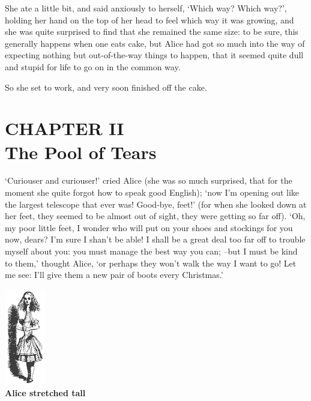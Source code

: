 \documentclass{article}
\begin{document}
She ate a little bit, and said anxiously to herself, `Which way? Which way?', holding her hand on the top of her head to feel which way it was growing, and she was quite surprised to find that she remained the same size: to be sure, this generally happens when one eats cake, but Alice had got so much into the way of expecting nothing but out-of-the-way things to happen, that it seemed quite dull and stupid for life to go on in the common way.

So she set to work, and very soon finished off the cake.

\newpage

\section*{CHAPTER II \\ The Pool of Tears}

`Curiouser and curiouser!' cried Alice (she was so much surprised, that for the moment she quite forgot how to speak good English); `now I'm opening out like the largest telescope that ever was! Good-bye, feet!' (for when she looked down at her feet, they seemed to be almost out of sight, they were getting so far off). `Oh, my poor little feet, I wonder who will put on your shoes and stockings for you now, dears? I'm sure I shan't be able! I shall be a great deal too far off to trouble myself about you: you must manage the best way you can; --but I must be kind to them,' thought Alice, `or perhaps they won't walk the way I want to go! Let me see: I'll give them a new pair of boots every Christmas.'

\begin{center}
    \includegraphics{AliceTall}\\
    \textbf{Alice stretched tall}
\end{center}

\end{document}
